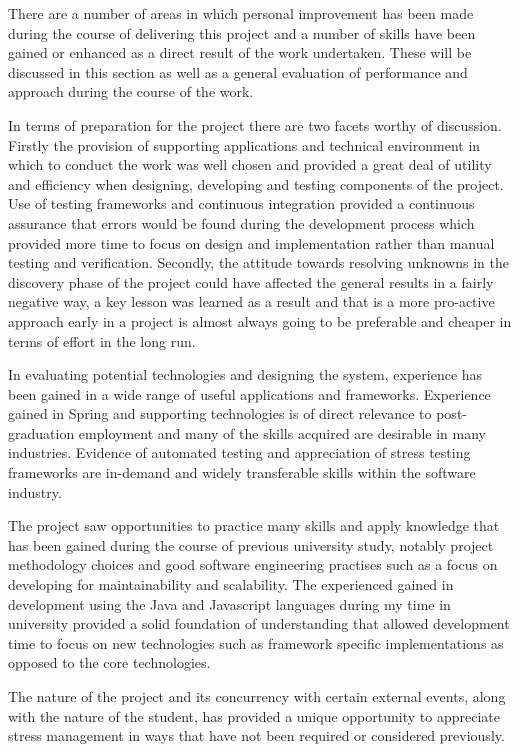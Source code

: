 There are a number of areas in which personal improvement has been made during the course of delivering this project and a number of skills have been gained or enhanced as a direct result of the work undertaken. These will be discussed in this section as well as a general evaluation of performance and approach during the course of the work.

In terms of preparation for the project there are two facets worthy of discussion. Firstly the provision of supporting applications and technical environment in which to conduct the work was well chosen and provided a great deal of utility and efficiency when designing, developing and testing components of the project. Use of testing frameworks and continuous integration provided a continuous assurance that errors would be found during the development process which provided more time to focus on design and implementation rather than manual testing and verification. Secondly, the attitude towards resolving unknowns in the discovery phase of the project could have affected the general results in a fairly negative way, a key lesson was learned as a result and that is a more pro-active approach early in a project is almost always going to be preferable and cheaper in terms of effort in the long run.

In evaluating potential technologies and designing the system, experience has been gained in a wide range of useful applications and frameworks. Experience gained in Spring and supporting technologies is of direct relevance to post-graduation employment and many of the skills acquired are desirable in many industries. Evidence of automated testing and appreciation of stress testing frameworks are in-demand and widely transferable skills within the software industry.

The project saw opportunities to practice many skills and apply knowledge that has been gained during the course of previous university study, notably project methodology choices and good software engineering practises such as a focus on developing for maintainability and scalability. The experienced gained in development using the Java and Javascript languages during my time in university provided a solid foundation of understanding that allowed development time to focus on new technologies such as framework specific implementations as opposed to the core  technologies.

The nature of the project and its concurrency with certain external events, along with the nature of the student, has provided a unique opportunity to appreciate stress management in ways that have not been required or considered previously.

